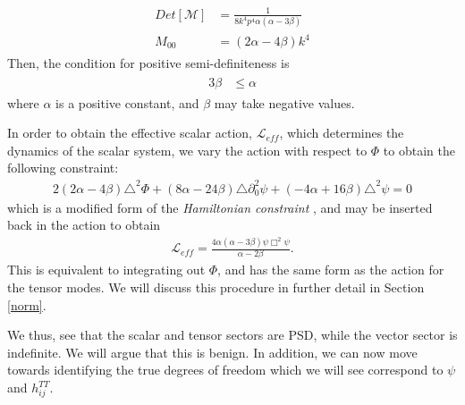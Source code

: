 \documentclass[aps,preprintnumbers,superscriptaddress,longbibliography]{revtex4-1}
\begin{document}
\begin{align}
\begin{split}
  Det[\mathcal{M}]&=\frac{1}{8k^4p^4\alpha(\alpha-3\beta)} \\ M_{00}&=(2\alpha-4\beta)k^4
\end{split}
\end{align}
Then, the condition for positive semi-definiteness is
\begin{align}
\begin{split}
     3\beta &\leq \alpha
     \end{split}
\end{align}
where $\alpha$ is a positive constant, and $\beta$ may take negative values.

In order to obtain the effective scalar action, $\mathcal{L}_{eff}$, which determines the dynamics of the scalar system, we vary the action with respect to $\Phi$ to obtain the following constraint:
\begin{align}
\label{eq:constraint}
    2(2\alpha-4\beta)\triangle^2\Phi+(8\alpha-24\beta)\triangle\partial_0^2\psi+(-4\alpha+16\beta)\triangle^2\psi=0
\end{align}
which is a modified form of the {\it Hamiltonian constraint} \cite{arnowitt1959dynamical}, and may be inserted back in the action to obtain
\begin{align}
\label{eq:MPP}\mathcal{L}_{eff}=\frac{4\alpha(\alpha-3\beta)\psi\Box^2\psi}{\alpha-2\beta}.
\end{align}
This is equivalent to integrating out $\Phi$, and has the same form as the action for the tensor modes. We will discuss this procedure  in further detail in Section \ref{norm}.

We thus, see that the scalar and tensor sectors are PSD, while the vector sector is indefinite. We will argue that this is benign. In addition, we can now move towards identifying the true degrees of freedom which we will see correspond to $\psi$ and $h^{TT}_{ij}$. 
\end{document}
